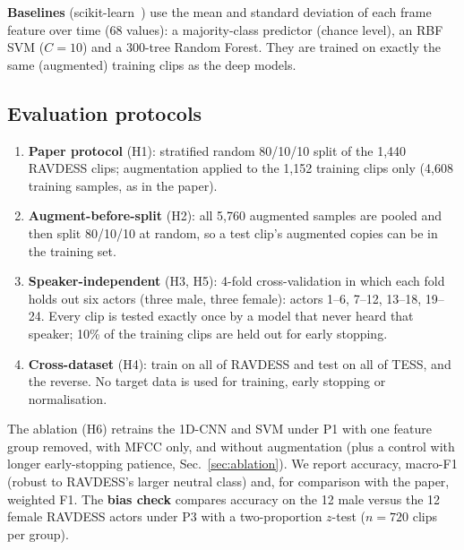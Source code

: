 \textbf{Baselines} (scikit-learn~\cite{pedregosa2011sklearn}) use the mean and standard deviation of each frame
feature over time (68 values): a majority-class predictor (chance level), an RBF SVM ($C\!=\!10$) and a 300-tree
Random Forest. They are trained on exactly the same (augmented) training clips as the deep models.

\subsection{Evaluation protocols}
\begin{enumerate}[label=\textbf{P\arabic*}]
  \item \textbf{Paper protocol} (H1): stratified random 80/10/10 split of the 1,440 RAVDESS clips;
        augmentation applied to the 1,152 training clips only (4,608 training samples, as in the paper).
  \item \textbf{Augment-before-split} (H2): all 5,760 augmented samples are pooled and then split 80/10/10 at random,
        so a test clip's augmented copies can be in the training set.
  \item \textbf{Speaker-independent} (H3, H5): 4-fold cross-validation in which each fold holds out six
        actors (three male, three female): actors 1--6, 7--12, 13--18, 19--24. Every clip is tested exactly once
        by a model that never heard that speaker; 10\% of the training clips are held out for early stopping.
  \item \textbf{Cross-dataset} (H4): train on all of RAVDESS and test on all of TESS, and the reverse. No target
        data is used for training, early stopping or normalisation.
\end{enumerate}
The ablation (H6) retrains the 1D-CNN and SVM under P1 with one feature group removed, with MFCC only, and
without augmentation (plus a control with longer early-stopping patience, Sec.~\ref{sec:ablation}). We report accuracy, macro-F1 (robust to RAVDESS's larger neutral class) and, for comparison
with the paper, weighted F1. The \textbf{bias check} compares accuracy on the 12 male versus the 12 female RAVDESS
actors under P3 with a two-proportion $z$-test ($n\!=\!720$ clips per group).



